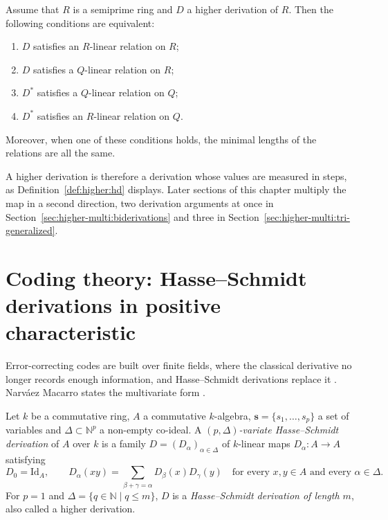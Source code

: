 \begin{theorem}\label{thm:higher:relations}
Assume that $R$ is a semiprime ring and $D$ a higher derivation of $R$.
Then the following conditions are equivalent:
\begin{enumerate}[label=(\roman*)]
\item $D$ satisfies an $R$-linear relation on $R$;
\item $D$ satisfies a $Q$-linear relation on $R$;
\item $D^{*}$ satisfies a $Q$-linear relation on $Q$;
\item $D^{*}$ satisfies an $R$-linear relation on $Q$.
\end{enumerate}
Moreover, when one of these conditions holds, the minimal lengths of the
relations are all the same.
\end{theorem}

A higher derivation is therefore a derivation whose values are measured in
steps, as Definition~\ref{def:higher:hd} displays. Later sections of this
chapter multiply the map in a second direction, two derivation arguments at
once in Section~\ref{sec:higher-multi:biderivations} and three in
Section~\ref{sec:higher-multi:tri-generalized}.

\section{Coding theory: Hasse--Schmidt derivations in positive characteristic}\label{sec:higher-multi:coding}

Error-correcting codes are built over finite fields, where the classical
derivative no longer records enough information, and Hasse--Schmidt
derivations replace it \cite[Introduction]{NarvaezMacarro2020}. Narv\'aez
Macarro states the multivariate form
\cite[Definition~2.1.1, p.~15]{NarvaezMacarro2020}.

\begin{definition}\label{def:higher:hasse-schmidt-variate}
Let $k$ be a commutative ring, $A$ a commutative $k$-algebra, $\mathbf{s}=\{s_1,\dots,s_p\}$
a set of variables and $\Delta\subset\mathbb{N}^p$ a non-empty co-ideal. A
\emph{$(p,\Delta)$-variate Hasse--Schmidt derivation} of $A$ over $k$ is a
family $D=(D_\alpha)_{\alpha\in\Delta}$ of $k$-linear maps $D_\alpha\colon A\to A$
satisfying
\[
D_0=\mathrm{Id}_A,\qquad D_\alpha(xy)=\sum_{\beta+\gamma=\alpha}D_\beta(x)D_\gamma(y)
\quad\text{for every }x,y\in A\text{ and every }\alpha\in\Delta.
\]
For $p=1$ and $\Delta=\{q\in\mathbb{N}\mid q\leq m\}$, $D$ is a
\emph{Hasse--Schmidt derivation of length $m$}, also called a higher derivation.
\end{definition}

